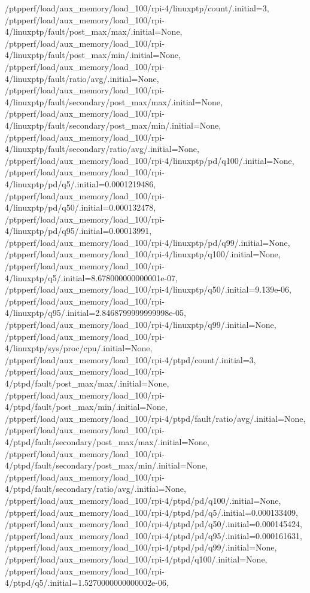 {    /ptpperf/load/aux_memory/load_100/rpi-4/linuxptp/count/.initial=3,
    /ptpperf/load/aux_memory/load_100/rpi-4/linuxptp/fault/post_max/max/.initial=None,
    /ptpperf/load/aux_memory/load_100/rpi-4/linuxptp/fault/post_max/min/.initial=None,
    /ptpperf/load/aux_memory/load_100/rpi-4/linuxptp/fault/ratio/avg/.initial=None,
    /ptpperf/load/aux_memory/load_100/rpi-4/linuxptp/fault/secondary/post_max/max/.initial=None,
    /ptpperf/load/aux_memory/load_100/rpi-4/linuxptp/fault/secondary/post_max/min/.initial=None,
    /ptpperf/load/aux_memory/load_100/rpi-4/linuxptp/fault/secondary/ratio/avg/.initial=None,
    /ptpperf/load/aux_memory/load_100/rpi-4/linuxptp/pd/q100/.initial=None,
    /ptpperf/load/aux_memory/load_100/rpi-4/linuxptp/pd/q5/.initial=0.0001219486,
    /ptpperf/load/aux_memory/load_100/rpi-4/linuxptp/pd/q50/.initial=0.000132478,
    /ptpperf/load/aux_memory/load_100/rpi-4/linuxptp/pd/q95/.initial=0.00013991,
    /ptpperf/load/aux_memory/load_100/rpi-4/linuxptp/pd/q99/.initial=None,
    /ptpperf/load/aux_memory/load_100/rpi-4/linuxptp/q100/.initial=None,
    /ptpperf/load/aux_memory/load_100/rpi-4/linuxptp/q5/.initial=8.678000000000001e-07,
    /ptpperf/load/aux_memory/load_100/rpi-4/linuxptp/q50/.initial=9.139e-06,
    /ptpperf/load/aux_memory/load_100/rpi-4/linuxptp/q95/.initial=2.8468799999999998e-05,
    /ptpperf/load/aux_memory/load_100/rpi-4/linuxptp/q99/.initial=None,
    /ptpperf/load/aux_memory/load_100/rpi-4/linuxptp/sys/proc/cpu/.initial=None,
    /ptpperf/load/aux_memory/load_100/rpi-4/ptpd/count/.initial=3,
    /ptpperf/load/aux_memory/load_100/rpi-4/ptpd/fault/post_max/max/.initial=None,
    /ptpperf/load/aux_memory/load_100/rpi-4/ptpd/fault/post_max/min/.initial=None,
    /ptpperf/load/aux_memory/load_100/rpi-4/ptpd/fault/ratio/avg/.initial=None,
    /ptpperf/load/aux_memory/load_100/rpi-4/ptpd/fault/secondary/post_max/max/.initial=None,
    /ptpperf/load/aux_memory/load_100/rpi-4/ptpd/fault/secondary/post_max/min/.initial=None,
    /ptpperf/load/aux_memory/load_100/rpi-4/ptpd/fault/secondary/ratio/avg/.initial=None,
    /ptpperf/load/aux_memory/load_100/rpi-4/ptpd/pd/q100/.initial=None,
    /ptpperf/load/aux_memory/load_100/rpi-4/ptpd/pd/q5/.initial=0.000133409,
    /ptpperf/load/aux_memory/load_100/rpi-4/ptpd/pd/q50/.initial=0.000145424,
    /ptpperf/load/aux_memory/load_100/rpi-4/ptpd/pd/q95/.initial=0.000161631,
    /ptpperf/load/aux_memory/load_100/rpi-4/ptpd/pd/q99/.initial=None,
    /ptpperf/load/aux_memory/load_100/rpi-4/ptpd/q100/.initial=None,
    /ptpperf/load/aux_memory/load_100/rpi-4/ptpd/q5/.initial=1.5270000000000002e-06,
}
